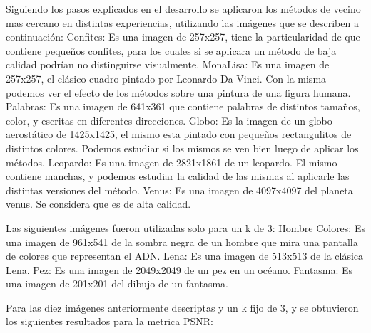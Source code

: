 \documentclass[a4paper]{article}
\newcounter{col}
\begin{document}
Siguiendo los pasos explicados en el desarrollo se aplicaron los métodos de vecino mas cercano en distintas experiencias, utilizando las imágenes que se describen a continuación:
\newline \newline Confites: Es una imagen de 257x257, tiene la particularidad de que contiene pequeños confites, para los cuales si se aplicara un método de baja calidad podrían no distinguirse visualmente.
\newline \newline MonaLisa: Es una imagen de 257x257, el clásico cuadro pintado por Leonardo Da Vinci. Con la misma podemos ver el efecto de los métodos sobre una pintura de una figura humana.
\newline \newline Palabras: Es una imagen de 641x361 que contiene palabras de distintos tamaños, color, y escritas en diferentes direcciones.
\newline \newline Globo: Es la imagen de un globo aerostático de 1425x1425, el mismo esta pintado con pequeños rectangulitos de distintos colores. Podemos estudiar si los mismos se ven bien luego de aplicar los métodos.
\newline \newline Leopardo: Es una imagen de 2821x1861 de un leopardo. El mismo contiene manchas, y podemos estudiar la calidad de las mismas al aplicarle las distintas versiones del método.
\newline \newline Venus: Es una imagen de 4097x4097 del planeta venus. Se considera que es de alta calidad.

Las siguientes imágenes fueron utilizadas solo para un k de 3:
\newline \newline Hombre Colores: Es una imagen de 961x541 de la sombra negra de un hombre que mira una pantalla de colores que representan el ADN.
\newline \newline Lena: Es una imagen de 513x513 de la clásica Lena.
\newline \newline Pez: Es una imagen de 2049x2049 de un pez en un océano.
\newline \newline Fantasma: Es una imagen de 201x201 del dibujo de un fantasma.

Para las diez imágenes anteriormente descriptas y un k fijo de 3, y se obtuvieron los siguientes resultados para la metrica PSNR:
\end{document}

